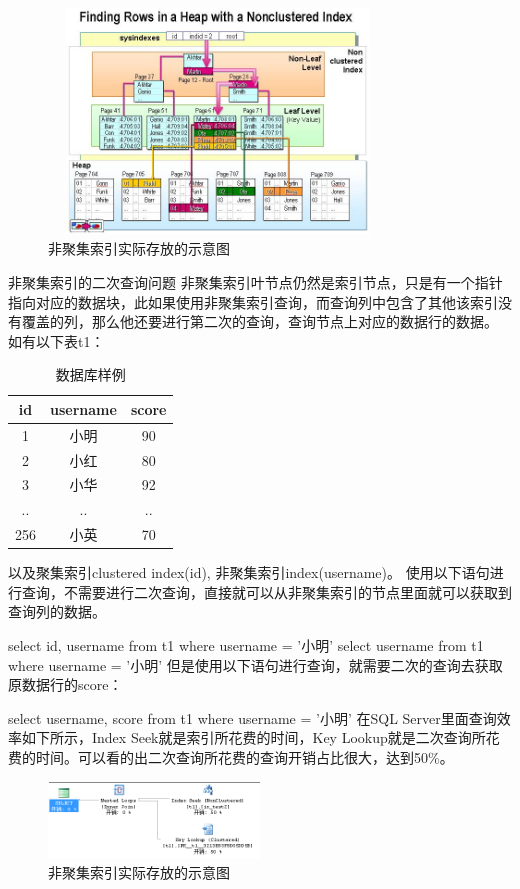 \documentclass[UTF8]{ctexart}
\begin{document}
\begin{figure}[htbp]
\centering
\includegraphics[height=6cm,width=9cm]{Figure/index1.png}
\caption{非聚集索引实际存放的示意图}
\end{figure}
非聚集索引的二次查询问题
非聚集索引叶节点仍然是索引节点，只是有一个指针指向对应的数据块，此如果使用非聚集索引查询，而查询列中包含了其他该索引没有覆盖的列，那么他还要进行第二次的查询，查询节点上对应的数据行的数据。
如有以下表t1：
\begin{table}[]
    \caption{数据库样例}
    \vspace{20pt}
    \centering
    \begin{tabular}{c|c|c}
        \hline
        id  & username & score\\
        \hline
        1	&小明	&90\\
		2	&小红&	80\\
		3	&小华&	92\\
		..	&..	&..\\
		256	&小英&	70\\
        \hline       
    \end{tabular}
    \label{bs2}
\end{table}

以及聚集索引clustered index(id), 非聚集索引index(username)。
使用以下语句进行查询，不需要进行二次查询，直接就可以从非聚集索引的节点里面就可以获取到查询列的数据。

select id, username from t1 where username = '小明'
select username from t1 where username = '小明'
但是使用以下语句进行查询，就需要二次的查询去获取原数据行的score：

select username, score from t1 where username = '小明'
在SQL Server里面查询效率如下所示，Index Seek就是索引所花费的时间，Key Lookup就是二次查询所花费的时间。可以看的出二次查询所花费的查询开销占比很大，达到50\%。
\begin{figure}[htbp]
\centering
\includegraphics[height=0.2\linewidth,width=0.5\textwidth]{Figure/index2.png}
\caption{非聚集索引实际存放的示意图}
\end{figure}
\end{document}
